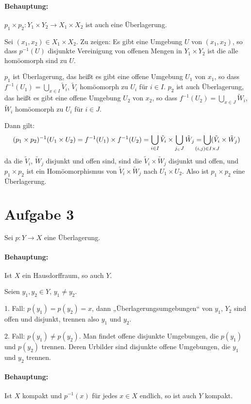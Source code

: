 \documentclass{article}
\begin{document}
\paragraph{Behauptung:} $p_1\times p_2: Y_1\times Y_2\to X_1\times X_2$ ist auch eine Überlagerung.

Sei $(x_1,x_2)\in X_1\times X_2$. Zu zeigen: Es gibt eine Umgebung $U$ von $(x_1,x_2)$, so dass $p^{-1}(U)$ disjunkte Vereinigung von offenen Mengen in $Y_1\times Y_2$ ist die alle homöomorph sind zu $U$.

$p_1$ ist Überlagerung, das heißt es gibt eine offene Umgebung $U_1$ von $x_1$, so dass $f^{-1}(U_1)=\bigcup_{x\in I}\tilde V_i$, $\tilde V_i$ homöomorph zu $U_i$ für $i\in I$.
$p_2$ ist auch Überlagerung, das heißt es gibt eine offene Umgebung $U_2$ von $x_2$, so dass $f^{-1}(U_2)=\bigcup_{x\in J}\tilde W_i$, $\tilde W_i$ homöomorph zu $U_i$ für $i\in J$.

Dann gilt:
\[(p_1\times p_2)^{-1}(U_1\times U_2) = f^{-1}(U_1) \times f^{-1}(U_2) = \bigcup _{i\in I} \tilde V_i \times \bigcup_{j_\in J} \tilde W_j = \bigcup_{\mathclap{(i,j)\in I\times J}} (\tilde V_i \times \tilde W_j)\]
da die $\tilde V_i$, $\tilde W_j$ disjunkt und offen sind, sind die $\tilde V_i \times \tilde W_j$ disjunkt und offen, und $p_1\times p_2$ ist ein Homöomorphismus von $\tilde V_i \times \tilde W_j$ nach $U_1\times U_2$. Also ist $p_1\times p_2$ eine Überlagerung.

\section*{Aufgabe 3}

Sei $p:Y\to X$ eine Überlagerung.

\paragraph{Behauptung:} Ist $X$ ein Hausdorffraum, so auch $Y$.

Seien $y_1,y_2\in Y$, $y_1\ne y_2$.

1. Fall: $p(y_1) = p(y_2) = x$, dann „Überlagerungsumgebungen“ von $y_1$, $Y_2$ sind offen und disjunkt, trennen also $y_1$ und $y_2$.

2. Fall: $p(y_1) \ne p(y_2)$. Man findet offene disjunkte Umgebungen, die $p(y_1)$ und $p(y_2)$ trennen. Deren Urbilder sind disjunkte offene Umgebungen, die $y_1$ und $y_2$ trennen.

\paragraph{Behauptung:} Ist $X$ kompakt und $p^{-1}(x)$ für jedes $x\in X$ endlich, so ist auch $Y$ kompakt.
\end{document}
